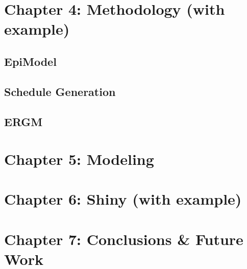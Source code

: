 \documentclass[
]{article}
\begin{document}
\hypertarget{chapter-4-methodology-with-example}{%
\section{Chapter 4: Methodology (with
example)}\label{chapter-4-methodology-with-example}}

\hypertarget{epimodel}{%
\subsection{EpiModel}\label{epimodel}}

\hypertarget{schedule-generation}{%
\subsection{Schedule Generation}\label{schedule-generation}}

\hypertarget{ergm}{%
\subsection{ERGM}\label{ergm}}

\hypertarget{chapter-5-modeling}{%
\section{Chapter 5: Modeling}\label{chapter-5-modeling}}

\hypertarget{chapter-6-shiny-with-example}{%
\section{Chapter 6: Shiny (with
example)}\label{chapter-6-shiny-with-example}}

\hypertarget{chapter-7-conclusions-future-work}{%
\section{Chapter 7: Conclusions \& Future
Work}\label{chapter-7-conclusions-future-work}}
\end{document}
